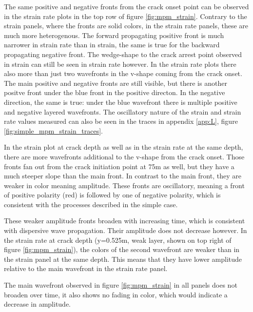 The same positive and negative fronts from the crack onset point can be observed in the strain rate plots in the top row of figure \ref{fig:mpm_strain}. Contrary to the strain panels, where the fronts are solid colors, in the strain rate panels, these are much more heterogenous. The forward propagating positive front is much narrower in strain rate than in strain, the same is true for the backward propagating negative front. The wedge-shape to the crack arrest point observed in strain can still be seen in strain rate however. In the strain rate plots there also more than just two wavefronts in the v-shape coming from the crack onset. The main positive and negative fronts are still visible, but there is another positve front under the blue front in the positive directon. In the negative direction, the same is true: under the blue wavefront there is multiple positive and negative layered wavefronts. The oscillatory nature of the strain and strain rate values measured can also be seen in the traces in appendix \ref{app:L}, figure \ref{fig:simple_mpm_strain_traces}. \par

In the strain plot at crack depth as well as in the strain rate at the same depth, there are more wavefronts additional to the v-shape from the crack onset. Those fronts fan out from the crack initiation point at 75m as well, but they have a much steeper slope than the main front. In contrast to the main front, they are weaker in color meaning amplitude. These fronts are oscillatory, meaning a front of positive polarity (red) is followed by one of negative polarity, which is consistent with the processes described in the simple case. \par

These weaker amplitude fronts broaden with increasing time, which is consistent with dispersive wave propagation. Their amplitude does not decrease however. In the strain rate at crack depth (y=0.525m, weak layer, shown on top right of figure \ref{fig:mpm_strain}), the colors of the second wavefront are weaker than in the strain panel at the same depth. This means that they have lower amplitude relative to the main wavefront in the strain rate panel. \par

The main wavefront observed in figure \ref{fig:mpm_strain} in all panels does not broaden over time, it also shows no fading in color, which would indicate a decrease in amplitude. \par 

